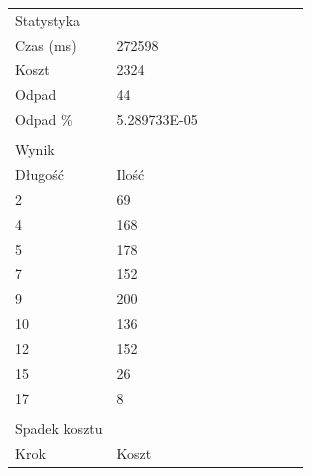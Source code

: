 \begin{longtable}{lllllllll}
Statystyka                &              &           &                  &    &    &    &   &    \\
Czas (ms)           & 272598       &           &                  &    &    &    &   &    \\
Koszt               & 2324         &           &                  &    &    &    &   &    \\
Odpad                    & 44           &           &                  &    &    &    &   &    \\
Odpad \%            & 5.289733E-05 &           &                  &    &    &    &   &    \\
                         &              &           &                  &    &    &    &   &    \\
Wynik         &              &           &                  &    &    &    &   &    \\
Długość                   & Ilość     &           &                  &    &    &    &   &    \\
2                        & 69           &           &                  &    &    &    &   &    \\
4                        & 168          &           &                  &    &    &    &   &    \\
5                        & 178          &           &                  &    &    &    &   &    \\
7                        & 152          &           &                  &    &    &    &   &    \\
9                        & 200          &           &                  &    &    &    &   &    \\
10                       & 136          &           &                  &    &    &    &   &    \\
12                       & 152          &           &                  &    &    &    &   &    \\
15                       & 26           &           &                  &    &    &    &   &    \\
17                       & 8            &           &                  &    &    &    &   &    \\
                         &              &           &                  &    &    &    &   &    \\
Spadek kosztu &              &           &                  &    &    &    &   &    \\
Krok                     & Koszt         &           &                  &    &    &    &   &    \\

\end{longtable}
